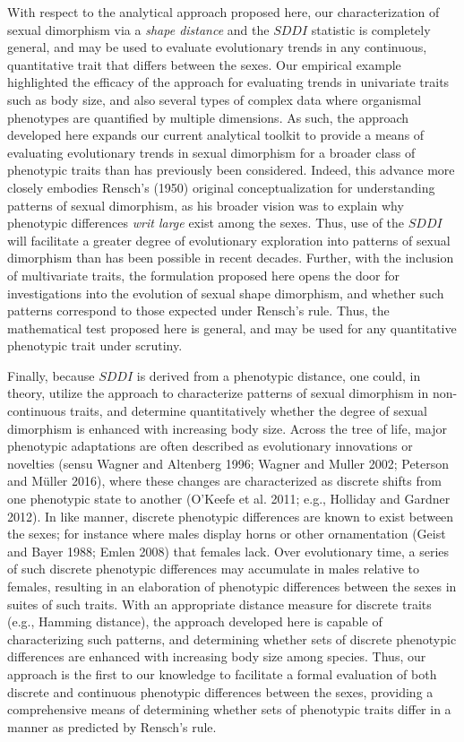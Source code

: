 \documentclass[]{article}
\begin{document}
With respect to the analytical approach proposed here, our
characterization of sexual dimorphism via a \emph{shape distance} and
the \(SDDI\) statistic is completely general, and may be used to
evaluate evolutionary trends in any continuous, quantitative trait that
differs between the sexes. Our empirical example highlighted the
efficacy of the approach for evaluating trends in univariate traits such
as body size, and also several types of complex data where organismal
phenotypes are quantified by multiple dimensions. As such, the approach
developed here expands our current analytical toolkit to provide a means
of evaluating evolutionary trends in sexual dimorphism for a broader
class of phenotypic traits than has previously been considered. Indeed,
this advance more closely embodies Rensch's (1950) original
conceptualization for understanding patterns of sexual dimorphism, as
his broader vision was to explain why phenotypic differences \emph{writ
large} exist among the sexes. Thus, use of the \(SDDI\) will facilitate
a greater degree of evolutionary exploration into patterns of sexual
dimorphism than has been possible in recent decades. Further, with the
inclusion of multivariate traits, the formulation proposed here opens
the door for investigations into the evolution of sexual shape
dimorphism, and whether such patterns correspond to those expected under
Rensch's rule. Thus, the mathematical test proposed here is general, and
may be used for any quantitative phenotypic trait under scrutiny.
\hfill\break

Finally, because \(SDDI\) is derived from a phenotypic distance, one
could, in theory, utilize the approach to characterize patterns of
sexual dimorphism in non-continuous traits, and determine quantitatively
whether the degree of sexual dimorphism is enhanced with increasing body
size. Across the tree of life, major phenotypic adaptations are often
described as evolutionary innovations or novelties (sensu Wagner and
Altenberg 1996; Wagner and Muller 2002; Peterson and Müller 2016), where
these changes are characterized as discrete shifts from one phenotypic
state to another (O'Keefe et al. 2011; e.g., Holliday and Gardner 2012).
In like manner, discrete phenotypic differences are known to exist
between the sexes; for instance where males display horns or other
ornamentation (Geist and Bayer 1988; Emlen 2008) that females lack. Over
evolutionary time, a series of such discrete phenotypic differences may
accumulate in males relative to females, resulting in an elaboration of
phenotypic differences between the sexes in suites of such traits. With
an appropriate distance measure for discrete traits (e.g., Hamming
distance), the approach developed here is capable of characterizing such
patterns, and determining whether sets of discrete phenotypic
differences are enhanced with increasing body size among species. Thus,
our approach is the first to our knowledge to facilitate a formal
evaluation of both discrete and continuous phenotypic differences
between the sexes, providing a comprehensive means of determining
whether sets of phenotypic traits differ in a manner as predicted by
Rensch's rule.
\end{document}
